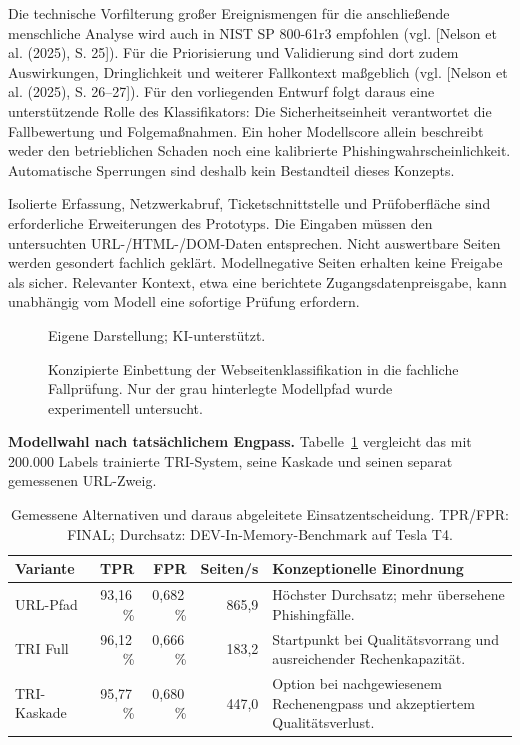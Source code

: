 Die technische Vorfilterung großer Ereignismengen für die anschließende menschliche Analyse
wird auch in NIST SP 800-61r3 empfohlen (vgl. [Nelson et al. (2025), S. 25]).
Für die Priorisierung und Validierung sind dort zudem Auswirkungen, Dringlichkeit und
weiterer Fallkontext maßgeblich (vgl. [Nelson et al. (2025), S. 26--27]).
Für den vorliegenden Entwurf folgt daraus eine unterstützende Rolle des Klassifikators:
Die Sicherheitseinheit verantwortet die Fallbewertung und Folgemaßnahmen. Ein hoher
Modellscore allein beschreibt weder den betrieblichen Schaden noch eine kalibrierte
Phishingwahrscheinlichkeit. Automatische Sperrungen sind deshalb kein Bestandteil dieses Konzepts.

Isolierte Erfassung, Netzwerkabruf, Ticketschnittstelle und Prüfoberfläche sind erforderliche
Erweiterungen des Prototyps. Die Eingaben müssen den untersuchten URL-/HTML-/DOM-Daten
entsprechen. Nicht auswertbare Seiten werden gesondert fachlich geklärt. Modellnegative
Seiten erhalten keine Freigabe als sicher. Relevanter Kontext, etwa eine berichtete
Zugangsdatenpreisgabe, kann unabhängig vom Modell eine sofortige Prüfung erfordern.

\begin{figure}[H]
\centering

\caption{Konzipierte Einbettung der Webseitenklassifikation in die fachliche Fallprüfung. Nur der grau hinterlegte Modellpfad wurde experimentell untersucht.}
\label{fig:betriebsprozess}
{\footnotesize Eigene Darstellung; KI-unterstützt.}
\end{figure}

\textbf{Modellwahl nach tatsächlichem Engpass.}
Tabelle~\ref{tab:business_model_choice} vergleicht das mit 200.000 Labels trainierte
TRI-System, seine Kaskade und seinen separat gemessenen URL-Zweig.

\begin{table}[H]
\centering
\caption{Gemessene Alternativen und daraus abgeleitete Einsatzentscheidung. TPR/FPR: FINAL; Durchsatz: DEV-In-Memory-Benchmark auf Tesla T4.}
\label{tab:business_model_choice}
\small
\begin{tabular}{lrrrp{5.0cm}}
\toprule
Variante & TPR & FPR & Seiten/s & Konzeptionelle Einordnung \\
\midrule
URL-Pfad & 93,16\,\% & 0,682\,\% & 865,9 & Höchster Durchsatz; mehr übersehene Phishingfälle. \\
TRI Full & 96,12\,\% & 0,666\,\% & 183,2 & Startpunkt bei Qualitätsvorrang und ausreichender Rechenkapazität. \\
TRI-Kaskade & 95,77\,\% & 0,680\,\% & 447,0 & Option bei nachgewiesenem Rechenengpass und akzeptiertem Qualitätsverlust. \\
\bottomrule
\end{tabular}
\end{table}

